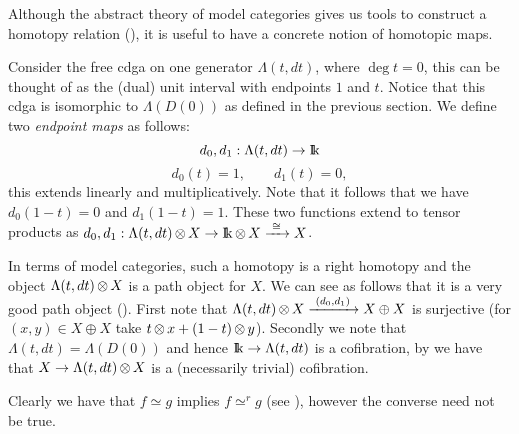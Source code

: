 
Although the abstract theory of model categories gives us tools to construct a homotopy relation (), it is useful to have a concrete notion of homotopic maps.

Consider the free cdga on one generator $\Lambda(t, dt)$, where $\deg{t} = 0$, this can be thought of as the (dual) unit interval with endpoints $1$ and $t$. Notice that this cdga is isomorphic to $\Lambda(D(0))$ as defined in the previous section. We define two \emph{endpoint maps} as follows:
$$ d_0, d_1 : \Lambda(t, dt) \to \mathrm{I\!k} $$
$$ d_0(t) = 1, \qquad d_1(t) = 0, $$
this extends linearly and multiplicatively. Note that it follows that we have $d_0(1-t) = 0$ and $d_1(1-t) = 1$. These two functions extend to tensor products as $d_0, d_1: \Lambda(t, dt) \operatorname*{\otimes} X \to \mathrm{I\!k} \operatorname*{\otimes} X \xrightarrow{\,\,{\cong}\,\,} X$.


In terms of model categories, such a homotopy is a right homotopy and the object $\Lambda(t, dt) \operatorname*{\otimes} X$ is a path object for $X$. We can see as follows that it is a very good path object (). First note that $\Lambda(t, dt) \operatorname*{\otimes} X \xrightarrow{\,\,{(d_0, d_1)}\,\,} X \oplus X$ is surjective (for $(x, y) \in X \oplus X$ take $t \operatorname*{\otimes} x + (1-t) \operatorname*{\otimes} y$). Secondly we note that $\Lambda(t, dt) = \Lambda(D(0))$ and hence $\mathrm{I\!k} \to \Lambda(t, dt)$ is a cofibration, by  we have that $X \to \Lambda(t, dt) \operatorname*{\otimes} X$ is a (necessarily trivial) cofibration.

Clearly we have that $f \simeq g$ implies $f \simeq^r g$ (see ), however the converse need not be true.




